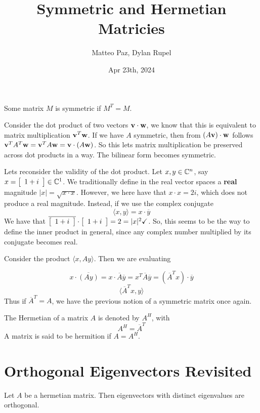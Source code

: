 \documentclass{article}
\author{Matteo Paz, Dylan Rupel}
\date{Apr 23th, 2024}
\title{Symmetric and Hermetian Matricies}
\begin{document}
    \maketitle{}
    \noindent

    \begin{definition}
        Some matrix $M$ is symmetric if $M^T = M$.
    \end{definition}

    Consider the dot product of two vectors $\mathbf{v} \cdot \mathbf{w}$, we know that this is equivalent to matrix multiplication $\mathbf{v}^T \mathbf{w}$.
    If we have $A$ symmetric, then from $(A\mathbf{v}) \cdot \mathbf{w}$ follows $\mathbf{v}^T A^T \mathbf{w} = \mathbf{v}^T A \mathbf{w} = \mathbf{v} \cdot (A\mathbf{w})$. So this lets matrix multiplication be preserved across dot products in a way. The bilinear form becomes symmetric. \vspace{1em}

    Lets reconsider the validity of the dot product. Let $x, y \in \mathbb{C}^n$, say $x = \left[\begin{array}{c}1 + i\end{array}\right] \in \mathbb{C}^1$. We traditionally define in the real vector spaces a \textbf{real} magnitude $|x| = \sqrt{x \cdot x}$. However, we here have that $x \cdot x = 2i$, which does not produce a real magnitude. Instead, if we use the complex conjugate
    \[\langle x, y \rangle = x \cdot \overline{y}\]
    We have that $\overline{\left[\begin{array}{c}1 + i\end{array}\right]} \cdot \left[\begin{array}{c}1 + i\end{array}\right] = 2 = |x|^2 \checkmark$. So, this seems to be the way to define the inner product in general, since any complex number multiplied by its conjugate becomes real. \vspace{1em}

    Consider the product $\langle x, Ay \rangle$. Then we are evaluating 
    
    \[x \cdot \overline{(Ay)} = x \cdot \overline{A}\overline{y} = x^T \overline{A} \overline{y} = (\overline{A}^T x) \cdot \overline{y}\]
    \[\langle \overline{A}^T x, y\rangle\]
    Thus if $\overline{A}^T = A$, we have the previous notion of a symmetric matrix once again.
    \begin{definition}
        The Hermetian of a matrix $A$ is denoted by $A^H$, with
        \[A^H = \overline{A}^T\]
        A matrix is said to be hermition if $A = A^H$.
    \end{definition}

    \section{Orthogonal Eigenvectors Revisited}
    \begin{proposition}
        Let $A$ be a hermetian matrix. Then eigenvectors with distinct eigenvalues are orthogonal.
    \end{proposition}
\end{document}
